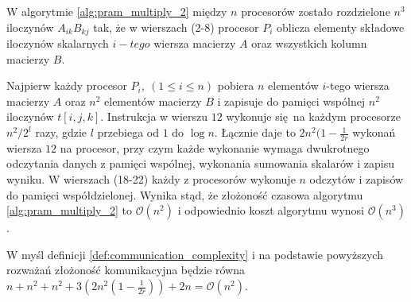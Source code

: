 W algorytmie \ref{alg:pram_multiply_2} między \(n\) procesorów zostało rozdzielone \(n^3\) iloczynów \(A_{ik}B_{kj}\) tak, że w wierszach (2-8) procesor \(P_i\) oblicza elementy składowe iloczynów skalarnych \(i-tego\) wiersza macierzy \(A\) oraz wszystkich kolumn macierzy \(B\).

Najpierw każdy procesor \(P_i,\:(1\leq i \leq n)\) pobiera \(n\) elementów \(i\)-tego wiersza macierzy \(A\) oraz \(n^2\) elementów macierzy \(B\) i zapisuje do pamięci wspólnej \(n^2\) iloczynów \(t[i,j,k]\). Instrukcja w wierszu \(12\) wykonuje się na każdym procesorze \(n^2/2^l\) razy, gdzie \(l\) przebiega od \(1\) do \(\log{n}\). Łącznie daje to \(2n^2(1-\frac{1}{2r}\) wykonań wiersza \(12\) na procesor, przy czym każde wykonanie wymaga dwukrotnego odczytania danych z pamięci wspólnej, wykonania sumowania skalarów i zapisu wyniku. W wierszach (18-22) każdy z procesorów wykonuje \(n\) odczytów i zapisów do pamięci współdzielonej. Wynika stąd, że złożoność czasowa algorytmu \ref{alg:pram_multiply_2} to \(\mathcal{O}(n^2)\) i odpowiednio koszt algorytmu wynosi \(\mathcal{O}(n^3)\).

 W myśl definicji \ref{def:communication_complexity} i na podstawie powyższych rozważań złożoność komunikacyjna będzie równa  \(n + n^2 + n^2 + 3(2n^2(1-\frac{1}{2r})) + 2n = \mathcal{O}(n^2)\).



